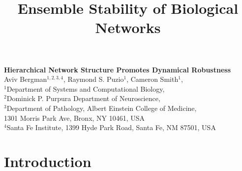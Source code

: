 



\let\ref\autoref

\title{Ensemble Stability of Biological Networks}


\begin{center}
{\Large
\textbf{Hierarchical Network Structure Promotes Dynamical Robustness}
}
\\[.5cm]
Aviv Bergman$^{1,2,3,4}$,
Raymond S. Puzio$^{1}$,
Cameron Smith$^{1}$,
\\[.5cm]
$^1$Department of Systems and Computational Biology,\\
$^2$Dominick P. Purpura Department of Neuroscience,\\
$^3$Department of Pathology, Albert Einstein College of Medicine,\\
1301 Morris Park Ave, Bronx, NY 10461, USA\\
$^4$Santa Fe Institute, 1399 Hyde Park Road, Santa Fe, NM 87501, USA
\\[.5cm]
\end{center}

{\begin{quote} \bf

\end{quote}}


\section{Introduction}


